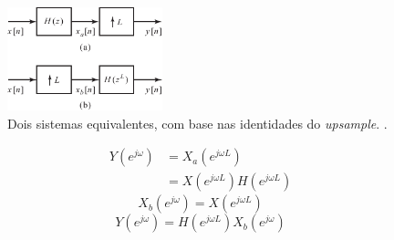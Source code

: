 \begin{frame}[allowframebreaks]
  \framebreak

        \begin{figure}[h!]
        \centering
        \includegraphics[width=0.4\textwidth]{images/fig432.pdf}
        \caption{Dois sistemas equivalentes, com base nas identidades do \textit{upsample}. \citep{oppenheim2009}.}
        \label{fig:fig432}
        \end{figure}

  \begin{align}
   Y(e^{j\omega}) &= X_a (e^{j\omega L})  \\
                  &= X(e^{j\omega L}) H(e^{j\omega L}) 
  \end{align}
  \begin{equation}
   X_b(e^{j\omega}) = X(e^{j\omega L})
  \end{equation}
  \begin{equation}
   Y(e^{j\omega}) = H(e^{j\omega L}) X_b(e^{j\omega})
  \end{equation}

\end{frame}


